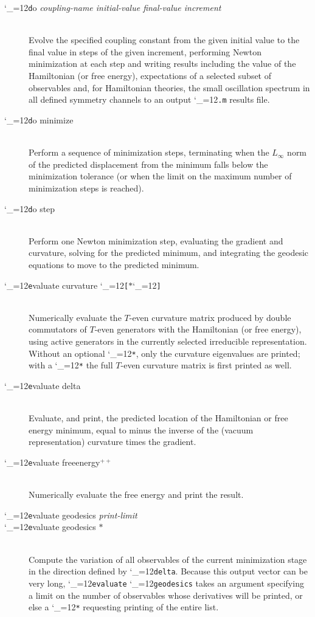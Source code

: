 \documentclass [12pt]{article}
\makeatletter
\renewcommand{\tt}{\begingroup\catcode`_=12\def\_{\string_}\tt@}
\newcommand{\tt@}[1]{\texttt{#1}\endgroup}
\makeatother
\begin{document}
\begin{description}
\item [\tt do {\it coupling-name initial-value final-value increment}]~\\
    Evolve the specified coupling constant
    from the given initial value to the final value in steps of the
    given increment, performing Newton minimization at each step
    and writing results including the value of the Hamiltonian (or free energy),
    expectations of a selected subset of observables and,
    for Hamiltonian theories, the small oscillation spectrum in all defined
    symmetry channels to an output \tt{.m} results file.

\item [\tt do minimize]~\\
    Perform a sequence of minimization steps,
    terminating when the $L_\infty$ norm of the predicted displacement from
    the minimum falls below the minimization tolerance (or when the
    limit on the maximum number of minimization steps is reached).

\item [\tt do step]~\\
    Perform one Newton minimization step,
    evaluating the gradient and curvature, solving for the
    predicted minimum, and integrating the geodesic equations
    to move to the predicted minimum.

\item [\tt evaluate curvature \tt{[}$*$\tt{]}]~\\
    Numerically evaluate the $T$-even curvature matrix
    produced by double commutators of $T$-even generators
    with the Hamiltonian (or free energy),
    using active generators in the currently selected irreducible representation.
    Without an optional \tt{*}, only the curvature eigenvalues are printed;
    with a \tt{*} the full $T$-even curvature matrix is first printed as well.

\item [\tt evaluate delta]~\\
    Evaluate, and print, the predicted location of the Hamiltonian or
    free energy minimum, equal to minus the inverse of the
    (vacuum representation) curvature times the gradient.

\item [\tt evaluate freeenergy$^{++}$]~\\
    Numerically evaluate the free energy and print the result.

\item [\tt evaluate geodesics {\it print-limit}] \bgroup \itemsep 0pt \parskip 0pt
\item [\tt evaluate geodesics $*$]~\\
    Compute the variation of all observables
    of the current minimization stage in the direction defined by \tt{delta}.
    Because this output vector can be very long, \tt{evaluate}
    \tt{geodesics} takes an argument specifying a limit on
    the number of observables whose derivatives will be printed,
    or else a \tt{*} requesting printing of the entire list.
\egroup


\end{description}
\end{document}
